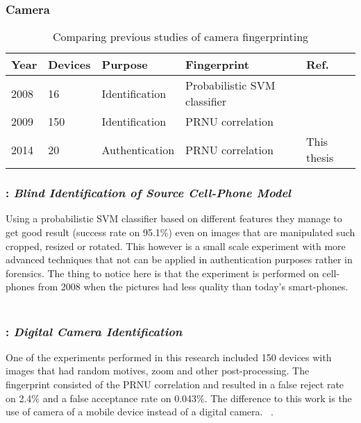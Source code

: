 \subsubsection*{Camera}\label{earlier:camera}
\begin{table}[H]
\centering
\begin{tabular}{| p{1cm} | p{1cm} | p{2.7cm} | p{3cm} | p{2.5cm} |}
  Year & Devices & Purpose & Fingerprint & Ref. \\ \hline
  2008 & 16 & Identification &  Probabilistic SVM classifier &~\cite[]{sensor:camera:blind} \\
  2009 & 150 & Identification & PRNU correlation &~\cite[]{sensor:camera:DCIdent} \\
  2014 & 20 & Authentication & PRNU correlation & This thesis \\ \hline
\end{tabular}
\caption{Comparing previous studies of camera fingerprinting} \label{table:prevCamera}
\end{table}

\subsubsection*{\cite[]{sensor:camera:blind}: \textit{Blind Identification of Source Cell-Phone Model}}
Using a probabilistic SVM classifier based on different features they manage to get good result (success rate on 95.1\%) even on images that are manipulated such cropped, resized or rotated. This however is a small scale experiment with more advanced techniques that not can be applied in authentication purposes rather in forensics. The thing to notice here is that the experiment is performed on cell-phones from 2008 when the pictures had less quality than today’s smart-phones.
~\cite[]{sensor:camera:blind}

\subsubsection*{\cite[]{sensor:camera:DCIdent}: \textit{Digital Camera Identification}}
One of the experiments performed in this research included 150 devices with images that had random motives, zoom and other post-processing. The fingerprint consisted of the PRNU correlation and resulted in a false reject rate on 2.4\% and a false acceptance rate on 0.043\%. The difference to this work is the use of camera of a mobile device instead of a digital camera.
~\cite[]{sensor:camera:DCIdent}.
